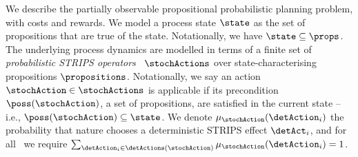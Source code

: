 

We describe the partially observable propositional probabilistic
planning problem, with costs and rewards. We model a process
state $\state$ as the set of propositions that are true of the
state. Notationally, we have $\state \subseteq
\props$. The underlying process
dynamics are modelled in terms of a finite set of {\em probabilistic
STRIPS operators}~\cite{boutilier:1996} $\stochActions$ over
state-characterising propositions $\propositions$.
Notationally, we say an action $\stochAction \in \stochActions$ is
applicable if its precondition $\poss(\stochAction)$, a set of
propositions, are satisfied in the current state -- i.e., $\poss(\stochAction) \subseteq
\state$. We denote $\mu_{\stochAction}(\detAction_i)$ the probability that
nature chooses a deterministic STRIPS effect $\detAct_i$, and for
all \stochAction\ we require
$\sum_{\detAction_i \in \detActions(\stochAction)}
\mu_{\stochAction}(\detAction_i) = 1$.


